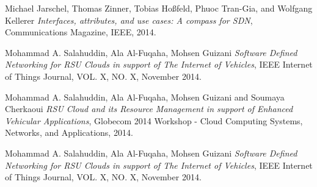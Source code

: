 \documentclass[conference]{IEEEtran}
\begin{document}


%
%
%

\newpage

\begin{thebibliography}{1}

Michael Jarschel, Thomas Zinner, Tobias Hoßfeld, Phuoc Tran-Gia, and Wolfgang Kellerer \emph{Interfaces, attributes, and use cases: A compass for SDN}, Communications Magazine, IEEE, 2014.

Mohammad A. Salahuddin, Ala Al-Fuqaha, Mohsen Guizani \emph{Software Defined Networking for RSU Clouds in support of The Internet of Vehicles}, IEEE Internet of Things Journal, VOL. X, NO. X, November 2014.

Mohammad A. Salahuddin, Ala Al-Fuqaha, Mohsen Guizani and Soumaya Cherkaoui \emph{RSU Cloud and its Resource Management in
support of Enhanced Vehicular Applications}, Globecom 2014 Workshop - Cloud Computing Systems, Networks, and Applications, 2014.

Mohammad A. Salahuddin, Ala Al-Fuqaha, Mohsen Guizani \emph{Software Defined Networking for RSU Clouds in support of The Internet of Vehicles}, IEEE Internet of Things Journal, VOL. X, NO. X, November 2014.

\end{thebibliography}
\end{document}
